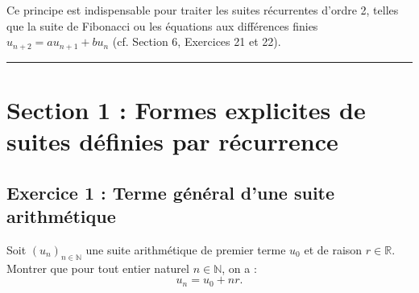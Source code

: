 \documentclass[11pt,a4paper]{article}
\newcommand{\N}{\mathbb{N}}
\newcommand{\R}{\mathbb{R}}
\begin{document}
Ce principe est indispensable pour traiter les suites récurrentes d'ordre 2, telles que la suite de Fibonacci ou les équations aux différences finies $u_{n+2} = a u_{n+1} + b u_n$ (cf. Section 6, Exercices 21 et 22).

\vspace{1cm}
\hrule
\vspace{1cm}
\section{Section 1 : Formes explicites de suites définies par récurrence}

\subsection*{Exercice 1 : Terme général d'une suite arithmétique}

Soit $(u_n)_{n \in \N}$ une suite arithmétique de premier terme $u_0$ et de raison $r \in \R$.
Montrer que pour tout entier naturel $n \in \N$, on a :
\[
u_n = u_0 + nr.
\]
\end{document}
